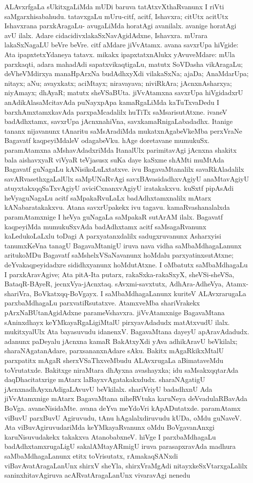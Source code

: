 ALAvxrfgaLa sUkitxgaLiMda mUDi baruva tatAtxvXthaRvanunx I riVti saMgarxhisabahudu. tatavxgaLu mUru-citf, acitf, Ishavxra; citUtx acitUtx Ishavxrana parxkAragaLu- avugaLiMda horatAgi avanilalx. avanige horatAgi avU ilalx. Adare cidacidivxlakaSxNavAgidAdxne, Ishavxra. mUrara lakaSxNagaLU beVre beVre. citf aMdare jiVvAtamx. avana savxrUpa hiVgide: Ata ipapxtetxYdaneya tatavx. mikakx ipapxtatxnAlukx yAvuveMdare: mUla parxkaqti, adara mahadAdi sapatxvikaqtigaLu, matutx SoVDasha vikAragaLu; deVheVMdirxya manaHpArxNa budAdhxyXdi vilakaSxNa; ajaDa; AnaMdarUpa; nitayx; aNu; avayxkatx; aciMtayx; niravayava; niviRkAra; jAcnxnAsharxya; niyAmayx; dhAyaR; matutx sheVSaBUta. jiVvAtamxna savxrUpa hiVgidadxrU anAdikAlasaMcitavAda puNayxpApa kamaRgaLiMda kaTuTxvaDedu I barxhAmxtamxkavAda parxpaMcadalilx huTiTx saMsarisutAtxne. ivaneV badAdhxtamx, savxrUpa jAcnxnahiVna, savxkamaRnigaLabadadhx. Itanige tananx nijavanunx tAnaritu saMsAradiMda mukatxnAgabeVkeMba perxVraNe Bagavatf kaqpeyiMdaleV odagabeVku. hAge doretavane mumukuSx. paramAtamxna aMshavAdadxriMda ItanalUlx parimitavAgi jAcnxna shakitx bala aishavxyaR viVyaR teVjasusx suKa daye kaSxme shAMti muMtAda Bagavatf guNagaLu kANisikoLuLxtatxve. ivu BagavaMtanalilx savaRkAladalilx savARvasethxgaLalUlx saMpUNaRvAgi savxBAvasidadhxvAgiyU anaMtavAgiyU atuyxtakxqqSaTxvAgiyU aviciCxnanxvAgiyU iratakakxvu. kuSxtf pipAsAdi heVyaguNagaLu acitf saMpakaRvuLaLx badAdhxtamxnalilx mAtarx kANabaratakakxvu. Atana savxrUpakekx ivu tagavu. kamaRvashanalalxda paramAtamxnige I heVya guNagaLa saMpakaR sutArAM ilalx. Bagavatf kaqpeyiMda mumukuSxvAda badAdhxtamx acitf saMsagaRvanunx kaLedukoLaLxlu toDagi A parxyatanxdalilx sadugxruvanunx Asharxyisi tanumxKeVna tanagU BagavaMtanigU iruva nava vidha saMbaMdhagaLanunx aritukoMDu Bagavatf saMshelxVSaNavanunx hoMdalu parxyatinxsutAtxne; deYvakaqpeyidadxre sididhxyanunx hoMdutAtxne. I oMbatutx saMbaMdhagaLu I parxkAravAgive; Ata pitA-Ita putarx, rakaSxka-rakaSxyX, sheVSi-sheVSa, BataqR-BAyeR, jecnxVya-jAcnxtaq. sAvxmi-savxtutx, AdhAra-AdheVya, Atamx-shariVra, BoVkatxqq-BoVgayx. I saMbaMdhagaLanunx kuriteV ALAvxrarugaLa parxbaMdhagaLu parxvatiRsutatxve. AtamxveMba shariVrakekx pArxNaBUtanAgidAdxne parameVshavxra. jiVvAtamxnige BagavaMtana sAninxdhayx keYMkayaRgaLigiMtalU pirxyavAdadudx matAtxvudU ilalx. mukitxyalUlx Ata bayasuvudu idanenxV. BagavaMtana dayeyU apAravAdadudx. adanunx paDeyalu jAcnxna kamaR BakAtxyXdi yAva adhikAravU beVkilalx; sharaNAgatanAdare, parxsananxnAdare sAku. Bakitx mAgaRkikxMtalU parxpatitx mAgaR sherxVSaThxveMbudu ALAvxrugaLa aBimataveMdu toVrutatxde. Bakitxge niraMtara dhAyxna avashayxka; idu saMsakxqqtarAda daqDhacitatxrige mAtarx laBayxvAgatakakxdudx. sharaNAgatigU jAcnxnadhAyxnAdigaLAvuvU beVkilalx. shariVriyU badadhxnU Ada jiVvAtamxnige mAtarx BagavaMtana niheRVtuka karuNeya deVvadulaRBavAda BoVga. avaneNisidaMte. avana deYva meYdoVri kApADutatxde. paramAtamx viBuvU parxBuvU Agiruvudu, tAnu hAgalalxdiruvudu kUDa, oMdu guNaveV. Ata viBuvAgiruvudariMda keYMkayaRvanunx oMdu BoVgavanAnxgi karuNisuvudakekx takakxva AtanobabxneV. hiVge I parxbaMdhagaLu badAdhxtamxrugaLigU sakalAMtayARmigU iruva parasapxravAda madhura saMbaMdhagaLanunx etitx toVrisutatx, rAmakaqSANxdi viBavAvatAragaLanUnx shirxV sheYla, shirxVraMgAdi nitayxkeSxVtarxgaLalilx saninxhitavAgiruva acARvatAragaLanUnx vivaravAgi nenedu 